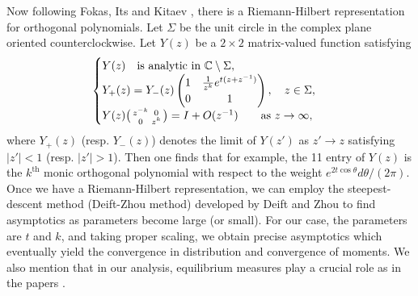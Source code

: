 Now following Fokas, Its and Kitaev \cite{FIK}, there is a Riemann-Hilbert
representation for orthogonal polynomials.
Let $\Sigma$ be the unit circle in the complex plane oriented
counterclockwise. 
Let $Y(z)$ be a $2\times 2$ matrix-valued function satisfying 
\begin{equation}
\begin{cases}
   Y(z) \quad\text{is analytic in $\mathbb C\setminus\Sigma$},\\
   Y_+(z)=Y_-(z) \begin{pmatrix} 1&\frac{1}{z^k}e^{t(z+z^{-1})}\\
0&1 \end{pmatrix}, \quad z\in\Sigma, \\
   Y(z) \bigl(\begin{smallmatrix} z^{-k}&0\\0&z^k
\end{smallmatrix} \bigr) = I+O(z^{-1})  
\qquad \text{as $z\to\infty$}, 
\end{cases}
\end{equation}
where $Y_+(z)$ (resp. $Y_-(z)$) denotes the limit of $Y(z')$ 
as $z'\to z$ satisfying $|z'|<1$ (resp. $|z'|>1$).
Then one finds that for example, the 11 entry of $Y(z)$ is the 
$k^{\text{th}}$ monic orthogonal polynomial with respect to the weight 
$e^{2t\cos\theta} d\theta/(2\pi)$.
Once we have a Riemann-Hilbert representation, we can employ the
steepest-descent method (Deift-Zhou method) developed by Deift and Zhou
\cite{DZ1} to find asymptotics as parameters become large (or small).
For our case, the parameters are $t$ and $k$, and taking proper scaling,
we obtain precise asymptotics which eventually yield the convergence in 
distribution and convergence of moments.
We also mention that in our analysis, equilibrium measures play a
crucial role as in the papers \cite{DKMVZ, DKMVZ2, DKMVZ3}.


